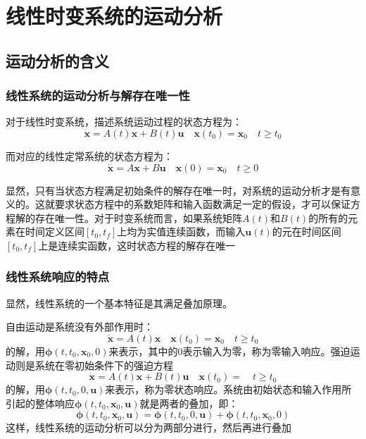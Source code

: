 \section{线性时变系统的运动分析}

\subsection{运动分析的含义}

\subsubsection{线性系统的运动分析与解存在唯一性}

对于线性时变系统，描述系统运动过程的状态方程为：
\begin{equation*}
    \dot{\bm{x}} = A(t) \bm{x} + B(t) \bm{u}  \quad   \bm{x}(t_0) = \bm{x}_0 \quad t \geq t_0
\end{equation*}

而对应的线性定常系统的状态方程为：
\begin{equation*}
    \dot{\bm{x}} = A \bm{x} + B \bm{u}  \quad   \bm{x}(0) = \bm{x}_0 \quad t \geq 0
\end{equation*}

显然，只有当状态方程满足初始条件的解存在唯一时，对系统的运动分析才是有意义的。这就要求状态方程中的系数矩阵和输入函数满足一定的假设，才可以保证方程解的存在唯一性。对于时变系统而言，如果系统矩阵$A(t)$和$B(t)$的所有的元素在时间定义区间$[t_0,t_f]$上均为实值连续函数，而输入$\bm{u}(t)$的元在时间区间$[t_0,t_f]$上是连续实函数，这时状态方程的解存在唯一

\subsubsection{线性系统响应的特点}

显然，线性系统的一个基本特征是其满足叠加原理。

自由运动是系统没有外部作用时：
\begin{equation*}
    \dot{\bm{x}} = A(t) \bm{x} \quad \bm{x}(t_0) = \bm{x}_0 \quad t \geq t_0
\end{equation*}
的解，用$\bm{\phi}(t,t_0,\bm{x}_0,0)$来表示，其中的$0$表示输入为零，称为零输入响应。强迫运动则是系统在零初始条件下的强迫方程
\begin{equation*}
    \dot{\bm{x}} = A(t) \bm{x} + B(t) \bm{u}  \quad   \bm{x}(t_0) =  \quad t \geq t_0
\end{equation*}
的解，用$\bm{\phi}(t,t_0,0,\bm{u})$来表示，称为零状态响应。系统由初始状态和输入作用所引起的整体响应$\bm{\phi}(t,t_0,\bm{x}_0,\bm{u})$就是两者的叠加，即：
\begin{equation*}
    \bm{\phi}(t,t_0,\bm{x}_0,\bm{u}) = \bm{\phi}(t,t_0,0,\bm{u}) + \bm{\phi}(t,t_0,\bm{x}_0,0)
\end{equation*}
这样，线性系统的运动分析可以分为两部分进行，然后再进行叠加


